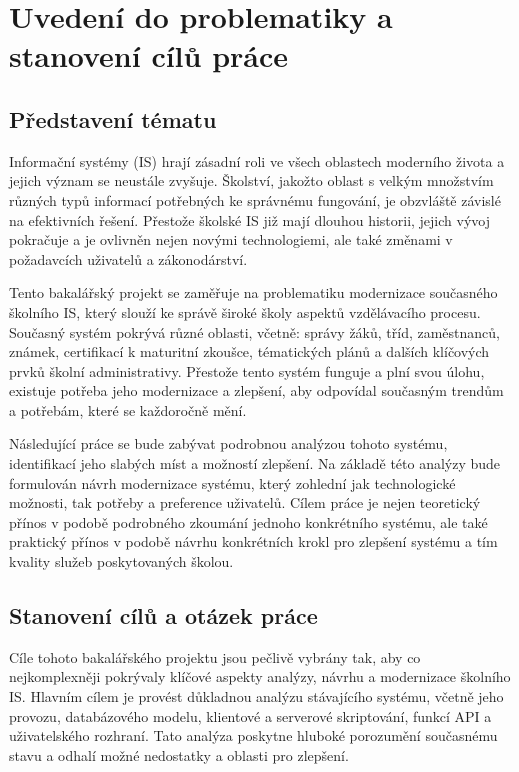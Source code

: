 \documentclass[FM,Proj]{tulthesis}
\begin{document}
\chapter{Uvedení do problematiky a stanovení cílů práce}
\section{Představení tématu}

Informační systémy (IS) hrají zásadní roli ve všech oblastech moderního
života a jejich význam se neustále zvyšuje. Školství, jakožto oblast 
s velkým množstvím různých typů informací potřebných ke správnému 
fungování, je obzvláště závislé na efektivních řešení. Přestože školské 
IS již mají dlouhou historii, jejich vývoj pokračuje a je ovlivněn nejen 
novými technologiemi, ale také změnami v požadavcích uživatelů a zákonodárství.

Tento bakalářský projekt se zaměřuje na problematiku modernizace současného 
školního IS, který slouží ke správě široké školy aspektů vzdělávacího procesu. 
Současný systém pokrývá různé oblasti, včetně: správy žáků, tříd, zaměstnanců, 
známek, certifikací k maturitní zkoušce, tématických plánů a dalších klíčových 
prvků školní administrativy. Přestože tento systém funguje a plní svou úlohu, 
existuje potřeba jeho modernizace a zlepšení, aby odpovídal současným trendům 
a potřebám, které se každoročně mění.

Následující práce se bude zabývat podrobnou analýzou tohoto systému, 
identifikací jeho slabých míst a možností zlepšení. Na základě této analýzy 
bude formulován návrh modernizace systému, který zohlední jak technologické 
možnosti, tak potřeby a preference uživatelů. Cílem práce je nejen teoretický 
přínos v podobě podrobného zkoumání jednoho konkrétního systému, ale také 
praktický přínos v podobě návrhu konkrétních krokl pro zlepšení systému a 
tím kvality služeb poskytovaných školou.

\section{Stanovení cílů a otázek práce}
Cíle tohoto bakalářského projektu jsou pečlivě vybrány tak, aby co 
nejkomplexněji pokrývaly klíčové aspekty analýzy, návrhu a modernizace školního 
IS. Hlavním cílem je provést důkladnou analýzu stávajícího systému, včetně 
jeho provozu, databázového modelu, klientové a serverové skriptování, funkcí 
API a uživatelského rozhraní. Tato analýza poskytne hluboké porozumění současnému
stavu a odhalí možné nedostatky a oblasti pro zlepšení.
\end{document}

